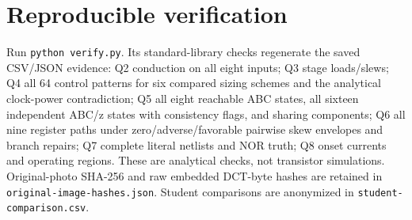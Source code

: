 \documentclass[10pt]{article}
\begin{document}
\section*{Reproducible verification}
Run \texttt{python verify.py}. Its standard-library checks regenerate the saved CSV/JSON evidence: Q2 conduction on all eight inputs; Q3 stage loads/slews; Q4 all 64 control patterns for six compared sizing schemes and the analytical clock-power contradiction; Q5 all eight reachable ABC states, all sixteen independent ABC/z states with consistency flags, and sharing components; Q6 all nine register paths under zero/adverse/favorable pairwise skew envelopes and branch repairs; Q7 complete literal netlists and NOR truth; Q8 onset currents and operating regions. These are analytical checks, not transistor simulations. Original-photo SHA-256 and raw embedded DCT-byte hashes are retained in \texttt{original-image-hashes.json}. Student comparisons are anonymized in \texttt{student-comparison.csv}.
\end{document}

